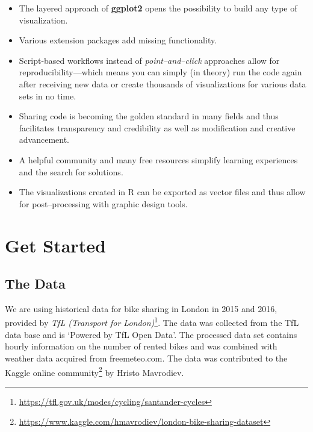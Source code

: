 \documentclass[
]{krantz}
\providecommand{\tightlist}{%
  \setlength{\itemsep}{0pt}\setlength{\parskip}{0pt}}
\renewcommand{\href}[2]{#2\footnote{\url{#1}}}
\begin{document}
\begin{itemize}
\tightlist
\item
  The layered approach of \textbf{ggplot2} opens the possibility to build any type of visualization.
\item
  Various extension packages add missing functionality.
\item
  Script-based workflows instead of \emph{point--and--click} approaches allow for reproducibility---which means you can simply (in theory) run the code again after receiving new data or create thousands of visualizations for various data sets in no time.
\item
  Sharing code is becoming the golden standard in many fields and thus facilitates transparency and credibility as well as modification and creative advancement.
\item
  A helpful community and many free resources simplify learning experiences and the search for solutions.
\item
  The visualizations created in R can be exported as vector files and thus allow for post--processing with graphic design tools.
\end{itemize}

\hypertarget{get-started}{%
\chapter{Get Started}\label{get-started}}

\hypertarget{data}{%
\section{The Data}\label{data}}

We are using historical data for bike sharing in London in 2015 and 2016, provided by \href{https://tfl.gov.uk/modes/cycling/santander-cycles}{\emph{TfL (Transport for London)}}. The data was collected from the TfL data base and is `Powered by TfL Open Data'. The processed data set contains hourly information on the number of rented bikes and was combined with weather data acquired from freemeteo.com. The data was contributed to the \href{https://www.kaggle.com/hmavrodiev/london-bike-sharing-dataset}{Kaggle online community} by Hristo Mavrodiev.
\end{document}
